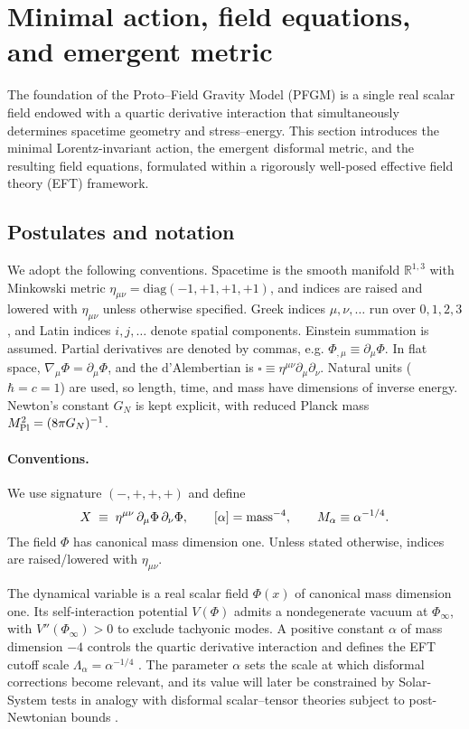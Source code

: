\documentclass{article}
\begin{document}

\section{Minimal action, field equations, and emergent metric}
\label{sec:action}

The foundation of the Proto–Field Gravity Model (PFGM) is a single real scalar field endowed with a quartic derivative interaction that simultaneously determines spacetime geometry and stress–energy. This section introduces the minimal Lorentz-invariant action, the emergent disformal metric, and the resulting field equations, formulated within a rigorously well-posed effective field theory (EFT) framework.

\subsection{Postulates and notation}

We adopt the following conventions. Spacetime is the smooth manifold $\mathbb{R}^{1,3}$ with Minkowski metric $\eta_{\mu\nu}=\mathrm{diag}(-1,+1,+1,+1)$, and indices are raised and lowered with $\eta_{\mu\nu}$ unless otherwise specified. Greek indices $\mu,\nu,\dots$ run over $0,1,2,3$, and Latin indices $i,j,\dots$ denote spatial components. Einstein summation is assumed. Partial derivatives are denoted by commas, e.g. $\Phi_{,\mu}\equiv\partial_\mu\Phi$. In flat space, $\nabla_\mu\Phi=\partial_\mu\Phi$, and the d’Alembertian is $\square\equiv\eta^{\mu\nu}\partial_\mu\partial_\nu$. Natural units ($\hbar=c=1$) are used, so length, time, and mass have dimensions of inverse energy. Newton’s constant $G_N$ is kept explicit, with reduced Planck mass $M_{\rm Pl}^2=(8\pi G_N)^{-1}$.
\paragraph{Conventions.}
We use signature $(-,+,+,+)$ and define
\[
X \;\equiv\; \eta^{\mu\nu}\,\partial_\mu\Phi\,\partial_\nu\Phi,
\qquad [\alpha]={\rm mass}^{-4},\qquad M_\alpha \equiv \alpha^{-1/4}.
\]
The field $\Phi$ has canonical mass dimension one. Unless stated otherwise, indices are raised/lowered with $\eta_{\mu\nu}$.

The dynamical variable is a real scalar field $\Phi(x)$ of canonical mass dimension one. Its self-interaction potential $V(\Phi)$ admits a nondegenerate vacuum at $\Phi_\infty$, with $V''(\Phi_\infty)>0$ to exclude tachyonic modes. A positive constant $\alpha$ of mass dimension $-4$ controls the quartic derivative interaction and defines the EFT cutoff scale $\Lambda_\alpha=\alpha^{-1/4}$ \cite{Burgess2020_EFTbook}. The parameter $\alpha$ sets the scale at which disformal corrections become relevant, and its value will later be constrained by Solar-System tests in analogy with disformal scalar–tensor theories subject to post-Newtonian bounds \cite{Ip2015_DisformalPPN}.
\end{document}
